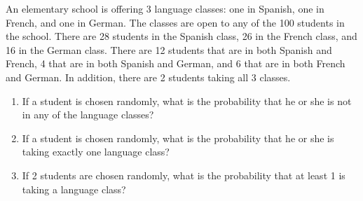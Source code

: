 \documentclass{article}[12pt]
\newenvironment{problem}[1]
  {\renewcommand\theinnercustomprblm{#1}\innercustomprblm}
  {\endinnercustomprblm}
\begin{document}
\begin{problem}{12}\normalfont
An elementary school is offering 3 language classes: one in Spanish, one in French, and one in German. 
The classes are open to any of the 100 students in the school. 
There are 28 students in the Spanish class, 26 in the French class, and 16 in the German class. 
There are 12 students that are in both Spanish and French, 4 that are in both Spanish and German, and 6 that are in both French and German. 
In addition, there are 2 students taking all 3 classes.
\begin{enumerate}[label=(\alph*)]
    \item If a student is chosen randomly, what is the probability that he or she is not in any of the language classes?
    \item If a student is chosen randomly, what is the probability that he or she is taking exactly one language class?
    \item If 2 students are chosen randomly, what is the probability that at least 1 is taking a language class?
\end{enumerate}
\end{problem}
\end{document}
